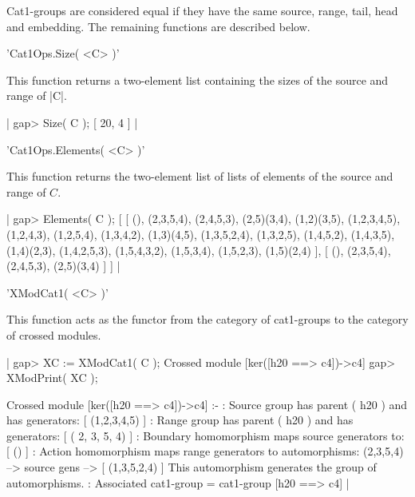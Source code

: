 Cat1-groups are considered equal if they have the same source, range,
tail, head and embedding.  The remaining functions are described below.


%

'Cat1Ops.Size( <C> )'

This function returns a two-element list containing the sizes
of the source and range of |C|.

|    gap> Size( C );
     [ 20, 4 ] | 
     
%

'Cat1Ops.Elements( <C> )'

This function returns the two-element list of lists of
elements of the source and range of  $C$.


|    gap> Elements( C );
    [ [ (), (2,3,5,4), (2,4,5,3), (2,5)(3,4), (1,2)(3,5), (1,2,3,4,5),
        (1,2,4,3), (1,2,5,4), (1,3,4,2), (1,3)(4,5), (1,3,5,2,4),
        (1,3,2,5), (1,4,5,2), (1,4,3,5), (1,4)(2,3), (1,4,2,5,3), 
        (1,5,4,3,2), (1,5,3,4), (1,5,2,3), (1,5)(2,4) ],
      [ (), (2,3,5,4), (2,4,5,3), (2,5)(3,4) ] ]  |

%

'XModCat1( <C> )'

This function acts as the functor from the category of cat1-groups
to the category of crossed modules.

|    gap> XC := XModCat1( C );
    Crossed module [ker([h20 ==> c4])->c4]
    gap> XModPrint( XC );

    Crossed module [ker([h20 ==> c4])->c4] :- 
    : Source group has parent ( h20 ) and has generators:
      [ (1,2,3,4,5) ]
    : Range group has parent ( h20 ) and has generators:
      [ ( 2, 3, 5, 4) ]
    : Boundary homomorphism maps source generators to:
      [ () ]
    : Action homomorphism maps range generators to automorphisms:
      (2,3,5,4) --> { source gens --> [ (1,3,5,2,4) ] }
      This automorphism generates the group of automorphisms.
    : Associated cat1-group = cat1-group [h20 ==> c4]  |

%

